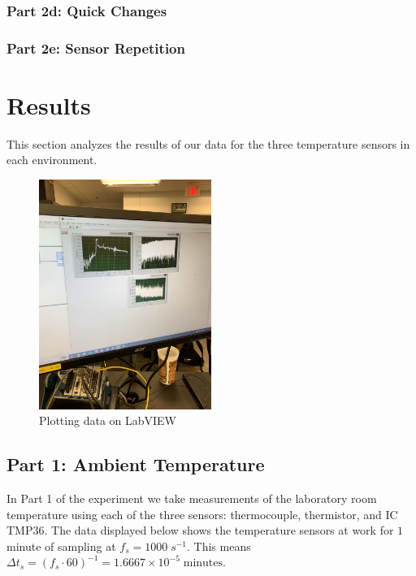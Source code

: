\documentclass{article}
\begin{document}
\subsubsection{Part 2d: Quick Changes} %


\subsubsection{Part 2e: Sensor Repetition} %



\section{Results}
This section analyzes the results of our data for the three temperature sensors in each environment.

\begin{figure}[H]
    \centering
    \includegraphics[width=0.5\textwidth, angle = -90]{lab2images/labview_plots.jpg}
    \caption{Plotting data on LabVIEW}
    \end{figure}
    
    \subsection{Part 1: Ambient Temperature}
    In Part 1 of the experiment we take measurements of the laboratory room temperature using each of the three sensors: thermocouple, thermistor, and IC TMP36. The data displayed below shows the temperature sensors at work for $1$ minute of sampling at $f_{s} = 1000\; s^{-1}$. This means $\Delta t_{s} = (f_{s}\cdot 60)^{-1} = 1.6667\times10^{-5}\; \text{minutes}$.
    
\end{document}
